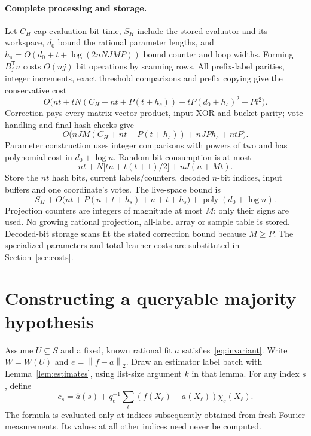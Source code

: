 \documentclass[11pt]{article}
\theoremstyle{remark}\newtheorem{remark}[theorem]{Remark}
\newcommand{\norm}[1]{\left\|#1\right\|}
\begin{document}
\paragraph{Complete processing and storage.}
Let $C_H$ cap evaluation bit time, $S_H$ include the stored evaluator and its workspace, $d_0$ bound the rational parameter lengths, and $h_s=O(d_0+t+\log(2nNJMP))$ bound counter and loop widths. Forming $B_j^{\mathsf T}u$ costs $O(nj)$ bit operations by scanning rows. All prefix-label parities, integer increments, exact threshold comparisons and prefix copying give the conservative cost
\[
 O\bigl(nt+tN(C_H+nt+P(t+h_s))+tP(d_0+h_s)^2+Pt^2\bigr).
\]
Correction pays every matrix-vector product, input XOR and bucket parity; vote handling and final hash checks give
\[
 O\bigl(nJM(C_H+nt+P(t+h_s))+nJP h_s+ntP\bigr).
\]
Parameter construction uses integer comparisons with powers of two and has polynomial cost in $d_0+\log n$. Random-bit consumption is at most
\begin{equation}\label{eq:hashrandom}
 nt+N\bigl[tn+t(t+1)/2\bigr]+nJ(n+Mt).
\end{equation}
Store the $nt$ hash bits, current labels/counters, decoded $n$-bit indices, input buffers and one coordinate's votes. The live-space bound is
\[
 S_H+O\bigl(nt+P(n+t+h_s)+n+t+h_s\bigr)
   +\operatorname{poly}(d_0+\log n).
\]
Projection counters are integers of magnitude at most $M$; only their signs are used. No growing rational projection, all-label array or sample table is stored. Decoded-bit storage scans fit the stated correction bound because $M\ge P$. The specialized parameters and total learner costs are substituted in Section~\ref{sec:costs}.

\section{Constructing a queryable majority hypothesis}
Assume $U\subseteq S$ and a fixed, known rational fit $a$ satisfies~\eqref{eq:invariant}. Write $W=W(U)$ and $e=\norm{f-a}_2$. Draw an estimator label batch with Lemma~\ref{lem:estimates}, using list-size argument $k$ in that lemma. For any index $s$, define
\begin{equation}\label{eq:ctilde}
 \widetilde c_s=\widehat a(s)+q_e^{-1}\sum_\ell
 (f(X_\ell)-a(X_\ell))\chi_s(X_\ell).
\end{equation}
The formula is evaluated only at indices subsequently obtained from fresh Fourier measurements. Its values at all other indices need never be computed.
\end{document}
